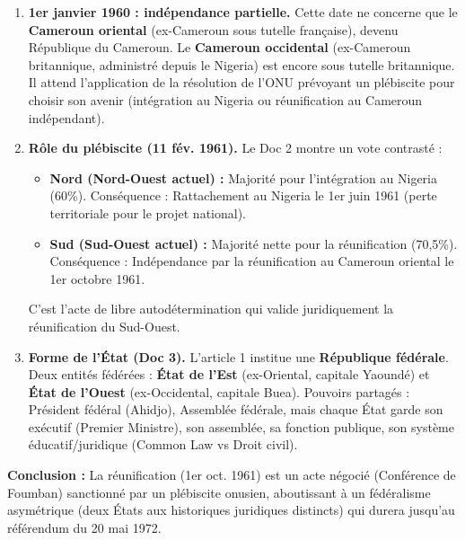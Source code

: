 \documentclass[11pt]{article}
\begin{document}
\begin{exoresolu}
\begin{enumerate}
\begin{itemize}
    \end{itemize}
    \item \textbf{1er janvier 1960 : indépendance partielle.} Cette date ne concerne que le \textbf{Cameroun oriental} (ex-Cameroun sous tutelle française), devenu République du Cameroun. Le \textbf{Cameroun occidental} (ex-Cameroun britannique, administré depuis le Nigeria) est encore sous tutelle britannique. Il attend l'application de la résolution de l'ONU prévoyant un plébiscite pour choisir son avenir (intégration au Nigeria ou réunification au Cameroun indépendant).
    \item \textbf{Rôle du plébiscite (11 fév. 1961).} Le Doc 2 montre un vote contrasté :
    \begin{itemize}
        \item \textbf{Nord (Nord-Ouest actuel) :} Majorité pour l'intégration au Nigeria (60\%). Conséquence : Rattachement au Nigeria le 1er juin 1961 (perte territoriale pour le projet national).
        \item \textbf{Sud (Sud-Ouest actuel) :} Majorité nette pour la réunification (70,5\%). Conséquence : Indépendance par la réunification au Cameroun oriental le 1er octobre 1961.
    \end{itemize}
    C'est l'acte de libre autodétermination qui valide juridiquement la réunification du Sud-Ouest.
    \item \textbf{Forme de l'État (Doc 3).} L'article 1 institue une \textbf{République fédérale}. Deux entités fédérées : \textbf{État de l'Est} (ex-Oriental, capitale Yaoundé) et \textbf{État de l'Ouest} (ex-Occidental, capitale Buea). Pouvoirs partagés : Président fédéral (Ahidjo), Assemblée fédérale, mais chaque État garde son exécutif (Premier Ministre), son assemblée, sa fonction publique, son système éducatif/juridique (Common Law vs Droit civil).
\end{enumerate}
\textbf{Conclusion :} La réunification (1er oct. 1961) est un acte négocié (Conférence de Foumban) sanctionné par un plébiscite onusien, aboutissant à un fédéralisme asymétrique (deux États aux historiques juridiques distincts) qui durera jusqu'au référendum du 20 mai 1972.
\end{exoresolu}
\end{document}
